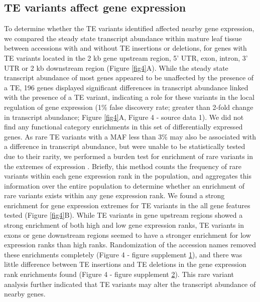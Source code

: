 \documentclass[12pt]{article}
\begin{document}
\subsection{TE variants affect gene expression}

To determine whether the TE variants identified affected nearby gene
expression, we compared the steady state transcript abundance within
mature leaf tissue between accessions with and without TE insertions
or deletions, for genes with TE variants located in the 2 kb gene
upstream region, 5' UTR, exon, intron, 3' UTR or 2 kb downstream
region (Figure \ref{fig4}A). While the steady state transcript
abundance of most genes appeared to be unaffected by the presence of a
TE, 196 genes displayed significant differences in transcript
abundance linked with the presence of a TE variant, indicating a role
for these variants in the local regulation of gene expression (1\%
false discovery rate; greater than 2-fold change in transcript
abundance; Figure \ref{fig4}A, Figure 4 - source data 1). We did
not find any functional category enrichments in this set of
differentially expressed genes. As rare TE variants with a MAF less
than 3\% may also be associated with a difference in transcript
abundance, but were unable to be statistically tested due to their
rarity, we performed a burden test for enrichment of rare variants in
the extremes of expression \cite{Zhao:2016gc}. Briefly, this method
counts the frequency of rare variants within each gene expression rank
in the population, and aggregates this information over the entire
population to determine whether an enrichment of rare variants exists
within any gene expression rank. We found a strong enrichment for gene
expression extremes for TE variants in the all gene features tested
(Figure \ref{fig4}B). While TE variants in gene upstream regions
showed a strong enrichment of both high and low gene expression ranks,
TE variants in exons or gene downstream regions seemed to have a
stronger enrichment for low expression ranks than high
ranks. Randomization of the accession names removed these enrichments
completely (Figure 4 - figure supplement \hyperref[fig4s1]{1}), and
there was little difference between TE insertions and TE deletions in
the gene expression rank enrichments found (Figure 4 - figure
supplement \hyperref[fig4s2]{2}). This rare variant analysis further
indicated that TE variants may alter the transcript abundance of
nearby genes.
\end{document}
